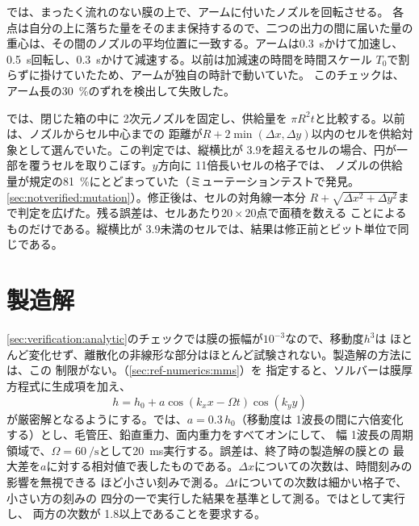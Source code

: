 では、まったく流れのない膜の上で、アームに付いたノズルを回転させる。
各点は自分の上に落ちた量をそのまま保持するので、二つの出力の間に届いた量の
重心は、その間のノズルの平均位置に一致する。アームは\SI{0.3}{\second}かけて加速し、
\SI{0.5}{\second}回転し、\SI{0.3}{\second}かけて減速する。以前は加減速の時間を時間スケール
$T_0$で割らずに掛けていたため、アームが独自の時計で動いていた。
このチェックは、アーム長の\SI{30}{\percent}のずれを検出して失敗した。

では、閉じた箱の中に 2次元ノズルを固定し、供給量を
 $\pi R^2 t$と比較する。以前は、ノズルからセル中心までの
距離が$R + 2\min(\Delta x, \Delta y)$以内のセルを供給対象として選んでいた。この判定では、縦横比が
3.9を超えるセルの場合、円が一部を覆うセルを取りこぼす。$y$方向に 11倍長いセルの格子では、
ノズルの供給量が規定の\SI{81}{\percent}にとどまっていた（ミューテーションテストで発見。
\cref{sec:notverified:mutation}）。修正後は、セルの対角線一本分
$R + \sqrt{\Delta x^2 + \Delta y^2}$まで判定を広げた。残る誤差は、セルあたり$20\times20$点で面積を数える
ことによるものだけである。縦横比が 3.9未満のセルでは、結果は修正前とビット単位で同じである。

\section{製造解}
\label{sec:verification:mms}

\cref{sec:verification:analytic}のチェックでは膜の振幅が$10^{-3}$なので、移動度$h^3$は
ほとんど変化せず、離散化の非線形な部分はほとんど試験されない。製造解の方法には、この
制限がない。（\cref{sec:ref-numerics:mms}）を
指定すると、ソルバーは膜厚方程式に生成項を加え、
\[
  h = h_0 + a\cos(k_x x - \Omega t)\cos(k_y y)
\]
が厳密解となるようにする。では、$a = 0.3\,h_0$（移動度は
1波長の間に六倍変化する）とし、毛管圧、鉛直重力、面内重力をすべてオンにして、
幅 1波長の周期領域で、$\Omega =
\SI{60}{\per\second}$として\SI{20}{\milli\second}実行する。誤差は、終了時の製造解の膜との
最大差を$a$に対する相対値で表したものである。$\Delta x$についての次数は、時間刻みの影響を無視できる
ほど小さい刻みで測る。$\Delta t$についての次数は細かい格子で、小さい方の刻みの
四分の一で実行した結果を基準として測る。ではとして実行し、
両方の次数が 1.8以上であることを要求する。

